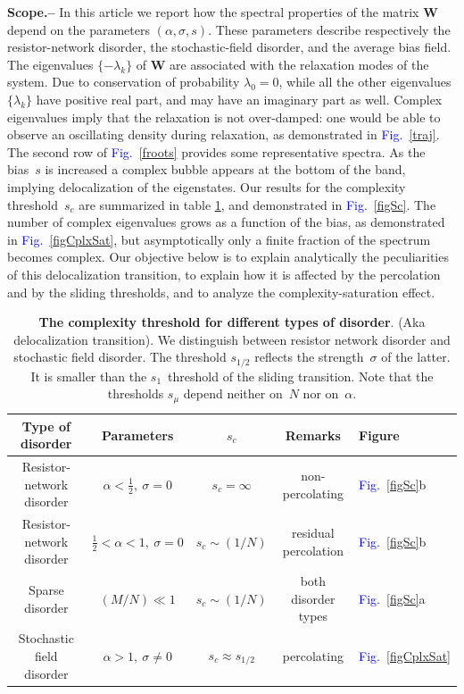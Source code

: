 \documentclass[aps,pre,floats,floatfix,twocolumn]{revtex4}
\newcommand{\Fig}[1]{\textcolor{blue}{Fig.}\!\!~\ref{#1}}
\newcommand{\sect}[1]{{\bf #1.-- }}
\begin{document}
\sect{Scope} 
In this article we report how the spectral properties of the matrix $\bm{W}$ 
depend on the parameters $(\alpha,\sigma,s)$. These parameters
describe respectively the resistor-network disorder, 
the stochastic-field disorder, and the average bias field.    
The eigenvalues $\{-\lambda_k\}$ of $\bm{W}$ are associated 
with the relaxation modes of the system. 
Due to conservation of probability ${\lambda_0=0}$, 
while all the other eigenvalues ${\{\lambda_k\}}$ have positive 
real part, and may have an imaginary part as well. 
Complex eigenvalues imply that the relaxation is not over-damped: 
one would be able to observe an oscillating density during relaxation, 
as demonstrated in \Fig{traj}.    
%
The second row of \Fig{froots} provides some representative spectra.
As the bias~$s$ is increased a complex bubble appears at the bottom 
of the band, implying delocalization of the eigenstates.   
Our results for the complexity threshold~$s_c$ are summarized 
in table \ref{tbl}, and demonstrated in \Fig{figSc}. 
The number of complex eigenvalues grows as a function 
of the bias, as demonstrated in \Fig{figCplxSat},  
but asymptotically only a finite fraction of the spectrum becomes complex. 
%
Our objective below is to explain analytically the 
peculiarities of this delocalization transition, 
to explain how it is affected by the percolation and by the sliding thresholds, 
and to analyze the complexity-saturation effect.  




\begin{table}

\begin{tabular}{|c|c|c|c|l|}
\hline 
Type of disorder & Parameters &  $s_c$ & Remarks & Figure \\ 
\hline
Resistor-network disorder & $\alpha{<}\frac{1}{2}, \ \sigma{=}0$    &  $s_c = \infty$ &  non-percolating & \Fig{figSc}b  \\
Resistor-network disorder & $\frac{1}{2}{<}\alpha{<}1, \ \sigma{=}0$   &  $s_c \sim (1/N)$ & residual percolation & \Fig{figSc}b \\
Sparse disorder & $(M/N) \ll 1$ &  $s_c \sim (1/N)$  &  both disorder types  &  \Fig{figSc}a \\
Stochastic field disorder & $\alpha{>}1, \ \sigma{\ne}0$ & $s_c \approx s_{1/2}$ & percolating & \Fig{figCplxSat} \\
\hline
\end{tabular}

\caption{\label{tbl}
{\bf The complexity threshold for different types of disorder}. (Aka delocalization transition). 
We distinguish between resistor network disorder and stochastic field disorder.  
The threshold $s_{1/2}$ reflects the strength~$\sigma$ of the latter. 
It is smaller than the $s_1$~threshold of the sliding transition.    
Note that the thresholds $s_{\mu}$ depend neither on~$N$ nor on~$\alpha$. 
} 

\end{table}
\end{document}
